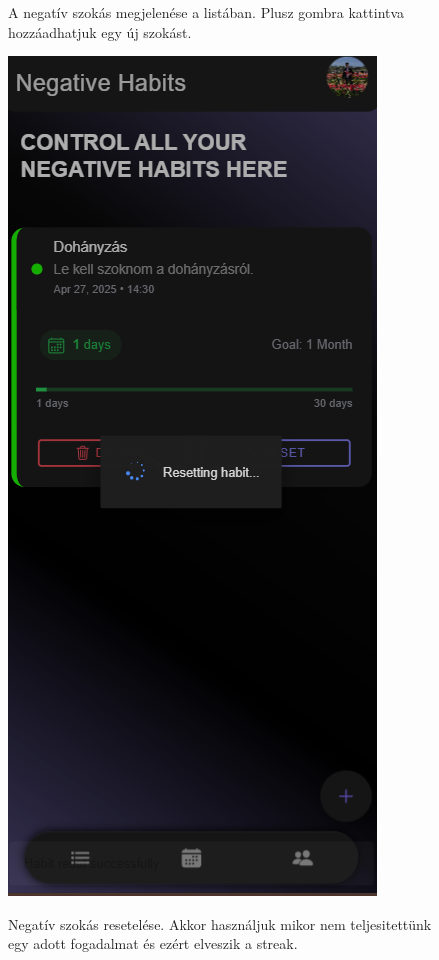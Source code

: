 \documentclass[12pt]{report}
\begin{document}
\begin{figure}[H]
\begin{minipage}[b]{0.2\textwidth}
        \par
        \footnotesize A negatív szokás megjelenése a listában. Plusz gombra kattintva hozzáadhatjuk egy új szokást.
    \end{minipage}
    \hfill
    \begin{minipage}[b]{0.2\textwidth}
        \centering
        \includegraphics[width=\linewidth]{src/resetingNegativeHabit.png}
        \par
        \footnotesize Negatív szokás resetelése. Akkor használjuk mikor nem teljesitettünk egy adott fogadalmat és ezért elveszik a streak.
    \end{minipage}


\end{figure}
\end{document}
